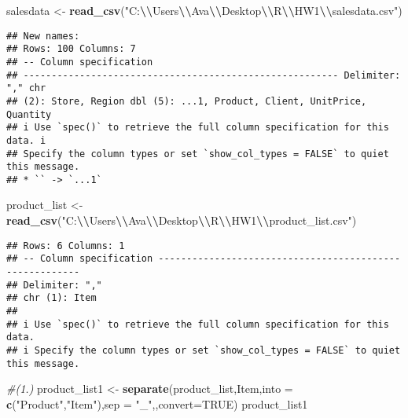 \documentclass[
]{article}
\newenvironment{Shaded}{\begin{snugshade}}{\end{snugshade}}
\newcommand{\AttributeTok}[1]{\textcolor[rgb]{0.13,0.29,0.53}{#1}}
\newcommand{\CommentTok}[1]{\textcolor[rgb]{0.56,0.35,0.01}{\textit{#1}}}
\newcommand{\ConstantTok}[1]{\textcolor[rgb]{0.56,0.35,0.01}{#1}}
\newcommand{\FunctionTok}[1]{\textcolor[rgb]{0.13,0.29,0.53}{\textbf{#1}}}
\newcommand{\NormalTok}[1]{#1}
\newcommand{\OtherTok}[1]{\textcolor[rgb]{0.56,0.35,0.01}{#1}}
\newcommand{\SpecialCharTok}[1]{\textcolor[rgb]{0.81,0.36,0.00}{\textbf{#1}}}
\newcommand{\StringTok}[1]{\textcolor[rgb]{0.31,0.60,0.02}{#1}}
\begin{document}
\begin{Shaded}
\begin{Highlighting}[]
\NormalTok{salesdata }\OtherTok{\textless{}{-}} \FunctionTok{read\_csv}\NormalTok{(}\StringTok{"C:}\SpecialCharTok{\textbackslash{}\textbackslash{}}\StringTok{Users}\SpecialCharTok{\textbackslash{}\textbackslash{}}\StringTok{Ava}\SpecialCharTok{\textbackslash{}\textbackslash{}}\StringTok{Desktop}\SpecialCharTok{\textbackslash{}\textbackslash{}}\StringTok{R}\SpecialCharTok{\textbackslash{}\textbackslash{}}\StringTok{HW1}\SpecialCharTok{\textbackslash{}\textbackslash{}}\StringTok{salesdata.csv"}\NormalTok{)}
\end{Highlighting}
\end{Shaded}

\begin{verbatim}
## New names:
## Rows: 100 Columns: 7
## -- Column specification
## -------------------------------------------------------- Delimiter: "," chr
## (2): Store, Region dbl (5): ...1, Product, Client, UnitPrice, Quantity
## i Use `spec()` to retrieve the full column specification for this data. i
## Specify the column types or set `show_col_types = FALSE` to quiet this message.
## * `` -> `...1`
\end{verbatim}

\begin{Shaded}
\begin{Highlighting}[]
\NormalTok{product\_list }\OtherTok{\textless{}{-}} \FunctionTok{read\_csv}\NormalTok{(}\StringTok{"C:}\SpecialCharTok{\textbackslash{}\textbackslash{}}\StringTok{Users}\SpecialCharTok{\textbackslash{}\textbackslash{}}\StringTok{Ava}\SpecialCharTok{\textbackslash{}\textbackslash{}}\StringTok{Desktop}\SpecialCharTok{\textbackslash{}\textbackslash{}}\StringTok{R}\SpecialCharTok{\textbackslash{}\textbackslash{}}\StringTok{HW1}\SpecialCharTok{\textbackslash{}\textbackslash{}}\StringTok{product\_list.csv"}\NormalTok{)}
\end{Highlighting}
\end{Shaded}

\begin{verbatim}
## Rows: 6 Columns: 1
## -- Column specification --------------------------------------------------------
## Delimiter: ","
## chr (1): Item
## 
## i Use `spec()` to retrieve the full column specification for this data.
## i Specify the column types or set `show_col_types = FALSE` to quiet this message.
\end{verbatim}

\begin{Shaded}
\begin{Highlighting}[]
\CommentTok{\#(1.)}
\NormalTok{product\_list1 }\OtherTok{\textless{}{-}} \FunctionTok{separate}\NormalTok{(product\_list,Item,}\AttributeTok{into =} \FunctionTok{c}\NormalTok{(}\StringTok{"Product"}\NormalTok{,}\StringTok{"Item"}\NormalTok{),}\AttributeTok{sep =} \StringTok{"\_"}\NormalTok{,,}\AttributeTok{convert=}\ConstantTok{TRUE}\NormalTok{)}
\NormalTok{product\_list1}
\end{Highlighting}
\end{Shaded}
\end{document}
